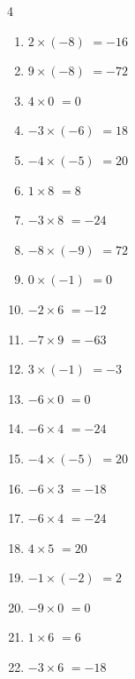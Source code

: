 \begin{multicols}{4}
\begin{enumerate}
  \item $2\times (-8)$
        $=-16$

  \item $9\times (-8)$
        $=-72$

  \item $4\times 0$
        $=0$

  \item $-3\times (-6)$
        $=18$

  \item $-4\times (-5)$
        $=20$

  \item $1\times 8$
        $=8$

\columnbreak %

  \item $-3\times 8$
        $=-24$

  \item $-8\times (-9)$
        $=72$

  \item $0\times (-1)$
        $=0$

  \item $-2\times 6$
        $=-12$

  \item $-7\times 9$
        $=-63$

  \item $3\times (-1)$
        $=-3$

  \item $-6\times 0$
        $=0$

  \item $-6\times 4$
        $=-24$

  \item $-4\times (-5)$
        $=20$

  \item $-6\times 3$
        $=-18$

  \item $-6\times 4$
        $=-24$

  \item $4\times 5$
        $=20$

  \item $-1\times (-2)$
        $=2$

  \item $-9\times 0$
        $=0$

  \item $1\times 6$
        $=6$

  \item $-3\times 6$
        $=-18$


\end{enumerate}
\end{multicols}

